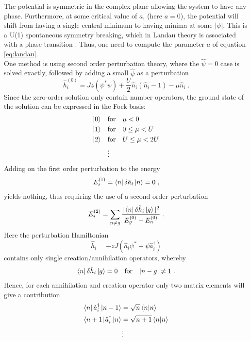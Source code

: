 The potential is symmetric in the complex plane allowing the system to have any phase. Furthermore, at some critical value of $a$, (here $a = 0$), the potential will shift from having a single central minimum to having minima at some $|\psi|$. This is a U(1) spontaneous symmetry breaking, which in Landau theory is associated with a phase transition \cite{plischke}. Thus, one need to compute the parameter $a$ of equation \ref{eq:landau}.\\
One method is using second order perturbation theory, where the $\hat{\psi} = 0$ case is solved exactly, followed by adding a small $\hat{\psi}$ as a perturbation
\begin{equation}
	\hat{h}_{i}^{(0)} = J z \left( \psi^* \psi \right) + \frac{U}{2} \hat{n}_i \left( \hat{n}_i -1 \right) - \mu \hat{n}_i \; .
\end{equation} 
Since the zero-order solution only contain number operators, the ground state of the solution can be expressed in the Fock basis:
\begin{align*}
	\ket{0} \quad &\text{for} \quad \mu < 0 \\
	\ket{1} \quad &\text{for} \quad 0 \leq \mu < U \\
	\ket{2} \quad &\text{for} \quad U \leq \mu < 2 U \\
	& \vdots
\end{align*} 
Adding on the first order perturbation to the energy
\begin{equation}
	E_{i}^{(1)} = \bra{n} \delta \hat{a}_i \ket{n} = 0 \; ,
\end{equation}
yields nothing, thus requiring the use of a second order perturbation
\begin{equation}
	E_{i}^{(2)} = \sum_{n \neq g} \frac{|\bra{n} \delta \hat{h}_i \ket{g}|^2}{E_{g}^{(0)} - E_{n}^{(0)}} \; .
\end{equation}
Here the perturbation Hamiltonian
\begin{equation}
	\hat{h}_i = - z J \left( \hat{a}_i \psi^* + \psi \hat{a}_{i}^{\dag} \right)
\end{equation}
contains only single creation/annihilation operators, whereby
\begin{equation}
	\bra{n} \delta \hat{h}_i \ket{g} = 0 \quad \text{for} \quad |n - g| \neq 1 \; .
\end{equation}
Hence, for each annihilation and creation operator only two matrix elements will give a contribution
\begin{align*}
	\bra{n}  \hat{a}_{i}^{\dag} \ket{n-1} &= \sqrt{n} \braket{n|n} \\
	\bra{n+1}  \hat{a}_{i}^{\dag} \ket{n} &= \sqrt{n+1} \braket{n|n} \\
	& \vdots
\end{align*}
